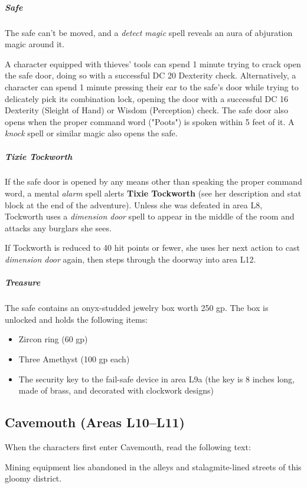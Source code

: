 \documentclass[10pt,a4paper,twoside,bg=print,twocolumn,openany,nodeprecatedcode]{dndbook}
\begin{document}
\subparagraph{Safe}
The safe can't be moved, and a \textit{detect magic} spell reveals an aura of abjuration magic around it.

A character equipped with thieves' tools can spend 1 minute trying to crack open the safe door, doing so with a successful DC 20 Dexterity check. Alternatively, a character can spend 1 minute pressing their ear to the safe's door while trying to delicately pick its combination lock, opening the door with a successful DC 16 Dexterity (Sleight of Hand) or Wisdom (Perception) check. The safe door also opens when the proper command word ("Poots") is spoken within 5 feet of it. A \textit{knock} spell or similar magic also opens the safe.

\subparagraph{Tixie Tockworth}
If the safe door is opened by any means other than speaking the proper command word, a mental \textit{alarm} spell alerts \textbf{Tixie Tockworth} (see her description and stat block at the end of the adventure). Unless she was defeated in area L8, Tockworth uses a \textit{dimension door} spell to appear in the middle of the room and attacks any burglars she sees.

If Tockworth is reduced to 40 hit points or fewer, she uses her next action to cast \textit{dimension door} again, then steps through the doorway into area L12.

\subparagraph{Treasure}
The safe contains an onyx-studded jewelry box worth 250 gp. The box is unlocked and holds the following items:


\begin{itemize}
\item Zircon ring (60 gp)
\item Three Amethyst (100 gp each)
\item The security key to the fail-safe device in area L9a (the key is 8 inches long, made of brass, and decorated with clockwork designs)
\end{itemize}

\subsection{Cavemouth (Areas L10–L11)}
When the characters first enter Cavemouth, read the following text:

\begin{DndReadAloud}{}
Mining equipment lies abandoned in the alleys and stalagmite-lined streets of this gloomy district.

\end{DndReadAloud}
\end{document}

